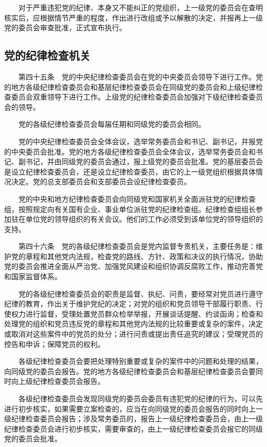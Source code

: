 　　对于严重违犯党的纪律、本身又不能纠正的党组织，上一级党的委员会在查明核实后，应根据情节严重的程度，作出进行改组或予以解散的决定，并报再上一级党的委员会审查批准，正式宣布执行。

    \subsection{党的纪律检查机关}
　　第四十五条　党的中央纪律检查委员会在党的中央委员会领导下进行工作。党的地方各级纪律检查委员会和基层纪律检查委员会在同级党的委员会和上级纪律检查委员会双重领导下进行工作。上级党的纪律检查委员会加强对下级纪律检查委员会的领导。

　　党的各级纪律检查委员会每届任期和同级党的委员会相同。

　　党的中央纪律检查委员会全体会议，选举常务委员会和书记、副书记，并报党的中央委员会批准。党的地方各级纪律检查委员会全体会议，选举常务委员会和书记、副书记，并由同级党的委员会通过，报上级党的委员会批准。党的基层委员会是设立纪律检查委员会，还是设立纪律检查委员，由它的上一级党组织根据具体情况决定。党的总支部委员会和支部委员会设纪律检查委员。

　　党的中央和地方纪律检查委员会向同级党和国家机关全面派驻党的纪律检查组，按照规定向有关国有企业、事业单位派驻党的纪律检查组。纪律检查组组长参加驻在单位党的领导组织的有关会议。他们的工作必须受到该单位党的领导组织的支持。

　　第四十六条　党的各级纪律检查委员会是党内监督专责机关，主要任务是：维护党的章程和其他党内法规，检查党的路线、方针、政策和决议的执行情况，协助党的委员会推进全面从严治党、加强党风建设和组织协调反腐败工作，推动完善党和国家监督体系。

　　党的各级纪律检查委员会的职责是监督、执纪、问责，要经常对党员进行遵守纪律的教育，作出关于维护党纪的决定；对党的组织和党员领导干部履行职责、行使权力进行监督，受理处置党员群众检举举报，开展谈话提醒、约谈函询；检查和处理党的组织和党员违反党的章程和其他党内法规的比较重要或复杂的案件，决定或取消对这些案件中的党员的处分；进行问责或提出责任追究的建议；受理党员的控告和申诉；保障党员的权利。

　　各级纪律检查委员会要把处理特别重要或复杂的案件中的问题和处理的结果，向同级党的委员会报告。党的地方各级纪律检查委员会和基层纪律检查委员会要同时向上级纪律检查委员会报告。

　　各级纪律检查委员会发现同级党的委员会委员有违犯党的纪律的行为，可以先进行初步核实，如果需要立案检查的，应当在向同级党的委员会报告的同时向上一级纪律检查委员会报告；涉及常务委员的，报告上一级纪律检查委员会，由上一级纪律检查委员会进行初步核实，需要审查的，由上一级纪律检查委员会报它的同级党的委员会批准。

